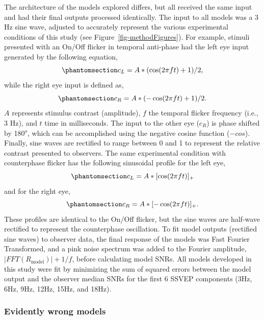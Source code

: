 \documentclass[
  12pt,
]{article}
\begin{document}
The architecture of the models explored differs, but all received the
same input and had their final outputs processed identically. The input
to all models was a 3 Hz sine wave, adjusted to accurately represent the
various experimental conditions of this study (see
Figure~\ref{fig-methodFigures}). For example, stimuli presented with an
On/Off flicker in temporal anti-phase had the left eye input generated
by the following equation,
\begin{equation}\phantomsection\label{eq-stimInput2L}{
c_L = A * (\cos(2 \pi ft)+1)/2,
}\end{equation} while the right eye input is defined as,
\begin{equation}\phantomsection\label{eq-stimInput2R}{
c_R = A * (-\cos(2 \pi ft)+1)/2.
}\end{equation} \(A\) represents stimulus contrast (amplitude), \(f\)
the temporal flicker frequency (i.e., 3 Hz), and \(t\) time in
milliseconds. The input to the other eye (\(c_R\)) is phase shifted by
180\(^o\), which can be accomplished using the negative cosine function
(\(-cos\)). Finally, sine waves are rectified to range between 0 and 1
to represent the relative contrast presented to observers. The same
experimental condition with counterphase flicker has the following
sinusoidal profile for the left eye,
\begin{equation}\phantomsection\label{eq-stimInput3L}{
c_L = A * [\cos(2 \pi ft)]_+
}\end{equation} and for the right eye,
\begin{equation}\phantomsection\label{eq-stimInput3R}{
c_R = A * [-\cos(2 \pi ft)]_+.
}\end{equation} These profiles are identical to the On/Off flicker, but
the sine waves are half-wave rectified to represent the counterphase
oscillation. To fit model outputs (rectified sine waves) to observer
data, the final response of the models was Fast Fourier Transformed, and
a pink noise spectrum was added to the Fourier amplitude,
\(|FFT(R_\text{model})|+1/f\), before calculating model SNRs. All models
developed in this study were fit by minimizing the sum of squared errors
between the model output and the observer median SNRs for the first 6
SSVEP components (3Hz, 6Hz, 9Hz, 12Hz, 15Hz, and 18Hz).

\subsubsection{Evidently wrong models}\label{evidently-wrong-models}
\end{document}
